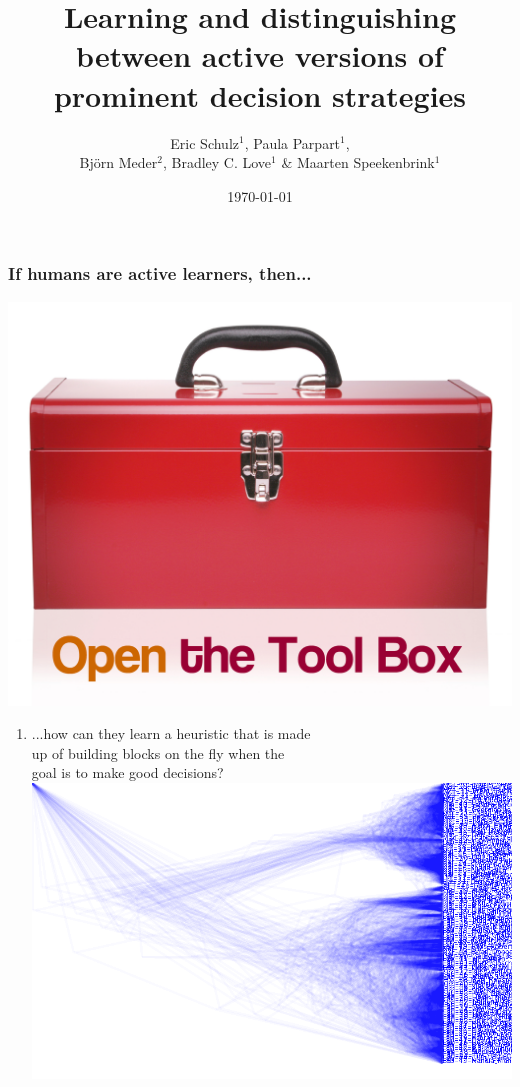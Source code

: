 \documentclass{beamer}
\begin{document}
\title[Seminar, University of Basel]{Learning and distinguishing between active versions of prominent decision strategies}
\author[Schulz, Parpart, Meder, Love \& Speekenbrink]{Eric Schulz$^1$, Paula Parpart$^1$, \\Bj\"orn Meder$^2$, Bradley C. Love$^1$ \& Maarten Speekenbrink$^1$}
\date{\today}



\begin{frame}
\titlepage
\end{frame}

\begin{frame}
 \frametitle{If humans are active learners, then...}
\hfill \includegraphics[scale=0.05]{toolbox.jpg}\vspace{-2cm}
\begin{enumerate}
\item  ...how can they learn a heuristic that is made\\ 
up of building blocks on the fly when the\\
goal is to make good decisions?\bigskip\\\vspace{1cm}
 \hfill \includegraphics[scale=0.08]{tree.png}\vspace{-2cm}

\end{enumerate}
\end{frame}
\end{document}
